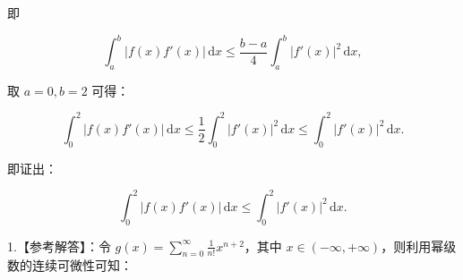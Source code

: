 即

\[ \int_{a}^{b}|f(x)f'(x)|\,\mathrm{d}x \leq \frac{b-a}{4}\int_{a}^{b}|f'(x)|^{2}\,\mathrm{d}x, \]



取 \(a=0, b=2\) 可得：

\[ \int_{0}^{2}|f(x)f'(x)|\,\mathrm{d}x \leq \frac{1}{2}\int_{0}^{2}|f'(x)|^{2}\,\mathrm{d}x \leq \int_{0}^{2}|f'(x)|^{2}\,\mathrm{d}x. \]



即证出：

\[ \int_{0}^{2}|f(x)f'(x)|\,\mathrm{d}x \leq \int_{0}^{2}|f'(x)|^{2}\,\mathrm{d}x. \]



1.【参考解答】：令 \(g(x) = \sum_{n=0}^{\infty}\frac{1}{n!}x^{n+2}\)，其中 \(x \in (-\infty, +\infty)\)，则利用幂级数的连续可微性可知：
